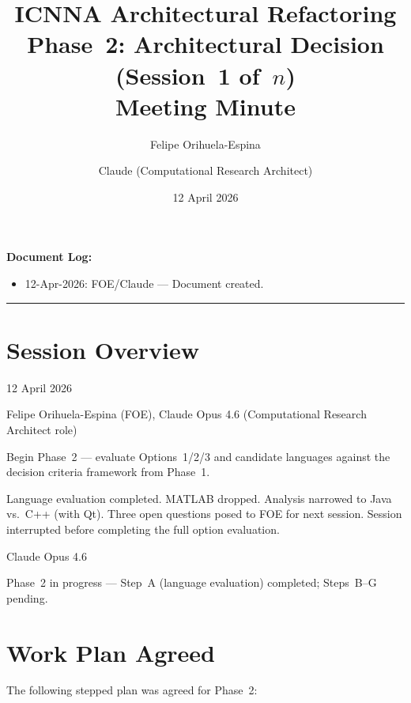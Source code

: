 \documentclass[11pt,a4paper]{article}
\title{ICNNA Architectural Refactoring\\Phase~2: Architectural Decision (Session~1 of~$n$)\\
\large Meeting Minute}
\author{Felipe Orihuela-Espina \and Claude (Computational Research Architect)}
\date{12 April 2026}
\begin{document}
\maketitle

\noindent\textbf{Document Log:}
\begin{itemize}[nosep]
    \item 12-Apr-2026: FOE/Claude --- Document created.
\end{itemize}

\vspace{1em}
\hrule
\vspace{1em}

\section{Session Overview}

\begin{description}[style=nextline]
    \item[Date:] 12 April 2026
    \item[Participants:] Felipe Orihuela-Espina (FOE), Claude Opus 4.6 (Computational Research Architect role)
    \item[Objective:] Begin Phase~2 --- evaluate Options~1/2/3 and candidate languages against the decision criteria framework from Phase~1.
    \item[Outcome:] Language evaluation completed. MATLAB dropped. Analysis narrowed to Java vs.\ C++ (with Qt). Three open questions posed to FOE for next session. Session interrupted before completing the full option evaluation.
    \item[Model used:] Claude Opus 4.6
    \item[Status:] Phase~2 in progress --- Step~A (language evaluation) completed; Steps~B--G pending.
\end{description}

\section{Work Plan Agreed}

The following stepped plan was agreed for Phase~2:
\end{document}
